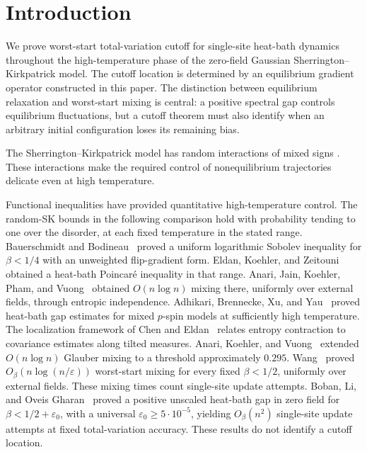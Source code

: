\section{Introduction}

We prove worst-start total-variation cutoff for single-site heat-bath
dynamics throughout the high-temperature phase of the zero-field
Gaussian Sherrington--Kirkpatrick model.  The cutoff location is
determined by an equilibrium gradient operator constructed in this
paper.  The distinction between equilibrium relaxation and worst-start
mixing is central: a positive spectral gap controls equilibrium
fluctuations, but a cutoff theorem must also identify when an arbitrary
initial configuration loses its remaining bias.

The Sherrington--Kirkpatrick model has random interactions of mixed
signs \cite{SK1975}.  These interactions make the required control of
nonequilibrium trajectories delicate even at high temperature.

Functional inequalities have provided quantitative high-temperature
control. The random-SK bounds in the following comparison hold with
probability tending to one over the disorder, at each fixed temperature
in the stated range.  Bauerschmidt and Bodineau~\cite{BB2019} proved a uniform
logarithmic Sobolev inequality for \(\beta<1/4\) with an unweighted
flip-gradient form.  Eldan, Koehler, and Zeitouni~\cite{EKZ2022}
obtained a heat-bath Poincar\'e inequality in that range.
Anari, Jain, Koehler, Pham, and Vuong~\cite{AJKPV2022} obtained
\(O(n\log n)\) mixing there, uniformly over external fields, through
entropic independence. Adhikari, Brennecke, Xu, and Yau~\cite{ABXY2024}
proved heat-bath gap estimates for mixed \(p\)-spin models at sufficiently
high temperature.
The localization framework of Chen and Eldan~\cite{CE2025} relates
entropy contraction to covariance estimates along tilted measures.
Anari, Koehler, and Vuong~\cite{AKV2024} extended
\(O(n\log n)\) Glauber mixing to a threshold approximately \(0.295\).
Wang~\cite{Wang2026} proved
\(O_\beta(n\log(n/\varepsilon))\) worst-start mixing for every fixed
\(\beta<1/2\), uniformly over external fields.
These mixing times count single-site update attempts.
Boban, Li, and Oveis Gharan~\cite{BLO2026} proved a positive unscaled
heat-bath gap in zero field for \(\beta<1/2+\varepsilon_0\), with a
universal \(\varepsilon_0\geq5\cdot10^{-5}\), yielding \(O_\beta(n^2)\) single-site update attempts at fixed
total-variation accuracy.
These results do not identify a cutoff location.

